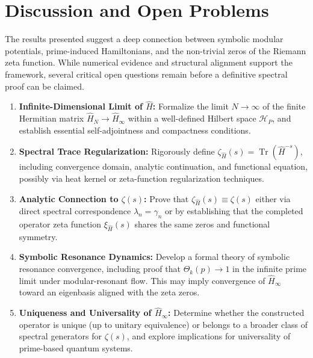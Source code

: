 \section{Discussion and Open Problems}
\vspace{10pt}

The results presented suggest a deep connection between symbolic modular potentials, prime-induced Hamiltonians, and the non-trivial zeros of the Riemann zeta function. While numerical evidence and structural alignment support the framework, several critical open questions remain before a definitive spectral proof can be claimed.

\begin{enumerate}
  \item \textbf{Infinite-Dimensional Limit of \( \hat{H} \):}  
  Formalize the limit \( N \to \infty \) of the finite Hermitian matrix \( \hat{H}_N \to \hat{H}_\infty \) within a well-defined Hilbert space \( \mathcal{H}_P \), and establish essential self-adjointness and compactness conditions.
  
  \item \textbf{Spectral Trace Regularization:}  
  Rigorously define \( \zeta_{\hat{H}}(s) = \operatorname{Tr}(\hat{H}^{-s}) \), including convergence domain, analytic continuation, and functional equation, possibly via heat kernel or zeta-function regularization techniques.

  \item \textbf{Analytic Connection to \( \zeta(s) \):}  
  Prove that \( \zeta_{\hat{H}}(s) \equiv \zeta(s) \) either via direct spectral correspondence \( \lambda_n = \gamma_n \) or by establishing that the completed operator zeta function \( \xi_{\hat{H}}(s) \) shares the same zeros and functional symmetry.

  \item \textbf{Symbolic Resonance Dynamics:}  
  Develop a formal theory of symbolic resonance convergence, including proof that \( \Theta_k(p) \to 1 \) in the infinite prime limit under modular-resonant flow. This may imply convergence of \( \hat{H}_\infty \) toward an eigenbasis aligned with the zeta zeros.

  \item \textbf{Uniqueness and Universality of \( \hat{H}_\infty \):}  
  Determine whether the constructed operator is unique (up to unitary equivalence) or belongs to a broader class of spectral generators for \( \zeta(s) \), and explore implications for universality of prime-based quantum systems.


\end{enumerate}
